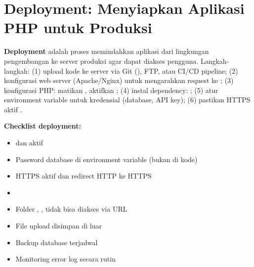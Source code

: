 \section{Deployment: Menyiapkan Aplikasi PHP untuk Produksi}

\textbf{Deployment} adalah proses memindahkan aplikasi dari lingkungan pengembangan ke server produksi agar dapat diakses pengguna. Langkah-langkah: (1) upload kode ke server via Git (), FTP, atau CI/CD pipeline; (2) konfigurasi web server (Apache/Nginx) untuk mengarahkan request ke ; (3) konfigurasi PHP: matikan , aktifkan ; (4) instal dependency: ; (5) atur environment variable untuk kredensial (database, API key); (6) pastikan HTTPS aktif \cite{phpRightWay}.

\begin{catatan}
\textbf{Checklist deployment:}
\begin{itemize}
  \item {} dan  aktif
  \item Password database di environment variable (bukan di kode)
  \item HTTPS aktif dan redirect HTTP ke HTTPS
  \item {}
  \item Folder , ,  tidak bisa diakses via URL
  \item File upload disimpan di luar 
  \item Backup database terjadwal
  \item Monitoring error log secara rutin
\end{itemize}
\end{catatan}


